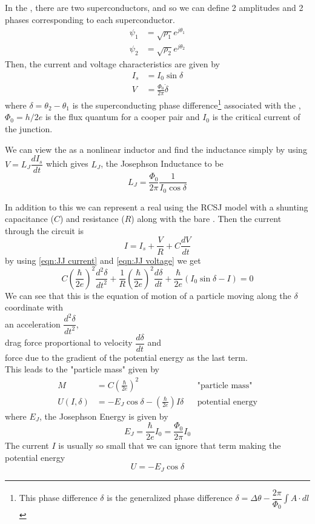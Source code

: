 In the \JJ, there are two superconductors, and so we can define 2 amplitudes and 2 phases corresponding to each superconductor.
\begin{align*}
\psi_1&=\sqrt{\rho_1}e^{j\theta_1}\\
\psi_2&=\sqrt{\rho_2}e^{j\theta_2}
\end{align*}
Then, the current and voltage characteristics are given by \cite{Harmans1997}
\begin{align}
I_s&=I_0\sin\delta
\label{eqn:JJ current}\\
V&=\frac{\Phi_0}{2\pi}\dot{\delta}
\label{eqn:JJ voltage}
\end{align}
where $\delta=\theta_2-\theta_1$ is the superconducting phase difference\footnote{This phase difference $\delta$ is the generalized phase difference $\delta=\Delta\theta-\displaystyle\dfrac{2\pi}{\Phi_0}\int A\cdot dl$} associated with the \JJ, $\Phi_0=h/2e$ is the flux quantum for a cooper pair and $I_0$ is the critical current of the junction.

We can view the \JJ as a nonlinear inductor and find the inductance simply by using $V=L_J\dfrac{dI_s}{dt}$ which gives $L_J$, the Josephson Inductance to be
\begin{equation}
L_J=\frac{\Phi_0}{2\pi}\frac{1}{I_0\cos\delta}
\end{equation}

In addition to this we can represent a real \JJ using the RCSJ model with a shunting capacitance ($C$) and resistance ($R$) along with the bare \JJ \cite{Harmans1997}. Then the current through the circuit is
\begin{equation}
I=I_s+\frac{V}{R}+C\frac{dV}{dt}
\end{equation}
by using \ref{eqn:JJ current} and \ref{eqn:JJ voltage} we get
\begin{equation}
C\left(\frac{\hbar}{2e}\right)^2\frac{d^2\delta}{dt^2}+\frac{1}{R}\left(\frac{\hbar}{2e}\right)^2\frac{d\delta}{dt}+\frac{\hbar}{2e}(I_0\sin\delta-I)=0
\end{equation}
We can see that this is the equation of motion of a particle moving along the $\delta$ coordinate with\\ an acceleration $\dfrac{d^2\delta}{dt^2}$,\\ drag force proportional to velocity $\dfrac{d\delta}{dt}$ and\\ force due to the gradient of the potential energy as the last term.\\
This leads to the "particle mass" given by
\begin{align}
M&=C\left(\frac{\hbar}{2e}\right)^2&&\text{"particle mass"}\\
U(I,\delta)&=-E_J\cos\delta-\left(\frac{\hbar}{2e}\right)I\delta&&\text{potential energy}
\end{align}
where $E_J$, the Josephson Energy is given by
\begin{equation}
E_J=\frac{\hbar}{2e}I_0=\frac{\Phi_0}{2\pi}I_0
\end{equation}
The current $I$ is usually so small that we can ignore that term making the potential energy
\begin{equation}
U=-E_J\cos\delta
\label{eqn:JJ potential energy}
\end{equation}

